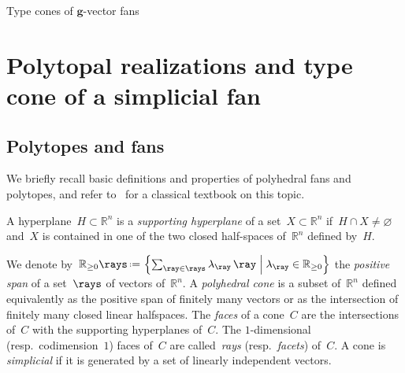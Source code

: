 \documentclass{amsart}
\makeatletter
\theoremstyle{definition}
\newcommand{\R}{\mathbb{R}} %
\renewcommand{\b}[1]{{\boldsymbol{#1}}} %
\newcommand{\set}[2]{\left\{ #1 \;\middle|\; #2 \right\}} %
\newcommand{\eqdef}{\mbox{\,\raisebox{0.2ex}{\scriptsize\ensuremath{\mathrm:}}\ensuremath{=}\,}} %
\newcommand{\darkblue}{\color{darkblue}} %
\newcommand{\defn}[1]{\textsl{\darkblue #1}} %
\def\part{\@startsection{part}{1}%
\z@{.7\linespacing\@plus\linespacing}{.8\linespacing}%
{\LARGE\sffamily\centering}}
\makeatother
\begin{document}
{
}


\newpage
{}
\part{Type cones of $\b{g}$-vector fans}
\label{part:geometry}


\section{Polytopal realizations and type cone of a simplicial fan}
\label{sec:typeCone}


\subsection{Polytopes and fans}
\label{ssec:polytopes and fans}

We briefly recall basic definitions and properties of polyhedral fans and polytopes, and refer to~\cite{Ziegler-polytopes} for a classical textbook on this topic.

A hyperplane~$H \subset \R^n$ is a \defn{supporting hyperplane} of a set~$X \subset \R^n$ if~$H \cap X \ne \varnothing$ and~$X$ is contained in one of the two closed half-spaces of~$\R^n$ defined by~$H$.

We denote by~$\R_{\ge0}\rays \eqdef \set{\sum_{\ray \in \rays} \lambda_{\ray} \, \ray}{\lambda_{\ray} \in \R_{\ge0}}$ the \defn{positive span} of a set~$\rays$ of vectors of~$\R^n$.
A \defn{polyhedral cone} is a subset of~$\R^n$ defined equivalently as the positive span of finitely many vectors or as the intersection of finitely many closed linear halfspaces.
The \defn{faces} of a cone~$C$ are the intersections of~$C$ with the supporting hyperplanes of~$C$.
The $1$-dimensional (resp.~codimension~$1$) faces of~$C$ are called~\defn{rays} (resp.~\defn{facets}) of~$C$.
A cone is \defn{simplicial} if it is generated by a set of linearly independent vectors.
\end{document}
